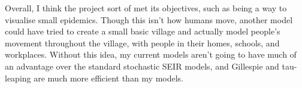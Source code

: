 \documentclass[11pt]{article}
\begin{document}
Overall, I think the project sort of met its objectives, such as being a way to visualise small epidemics. Though this isn't how humans move, another model could have tried to create a small basic village and actually model people's movement throughout the village, with people in their homes, schools, and workplaces. Without this idea, my current models aren't going to have much of an advantage over the standard stochastic SEIR models, and Gillespie and tau-leaping are much more efficient than my models.
\end{document}
